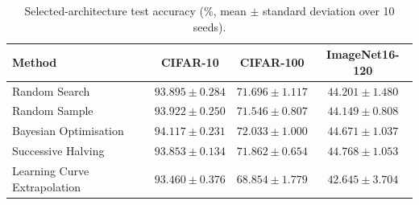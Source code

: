 \begin{table}[htbp]
    \centering
    \begin{tabular}{|l|c|c|c|}
        \hline
        \textbf{Method}
        & \textbf{CIFAR-10}
        & \textbf{CIFAR-100}
        & \textbf{ImageNet16-120} \\
        \hline
        Random Search
        & $93.895 \pm 0.284$
        & $71.696 \pm 1.117$
        & $44.201 \pm 1.480$ \\
        Random Sample
        & $93.922 \pm 0.250$
        & $71.546 \pm 0.807$
        & $44.149 \pm 0.808$ \\
        Bayesian Optimisation
        & $\mathbf{94.117 \pm 0.231}$
        & $\mathbf{72.033 \pm 1.000}$
        & $44.671 \pm 1.037$ \\
        Successive Halving
        & $93.853 \pm 0.134$
        & $71.862 \pm 0.654$
        & $\mathbf{44.768 \pm 1.053}$ \\
        Learning Curve Extrapolation
        & $93.460 \pm 0.376$
        & $68.854 \pm 1.779$
        & $42.645 \pm 3.704$ \\ \hline
    \end{tabular}
    \caption{Selected-architecture test accuracy (\%, mean $\pm$ standard deviation over 10 seeds).}
    \label{tab:test-accuracy}
\end{table}